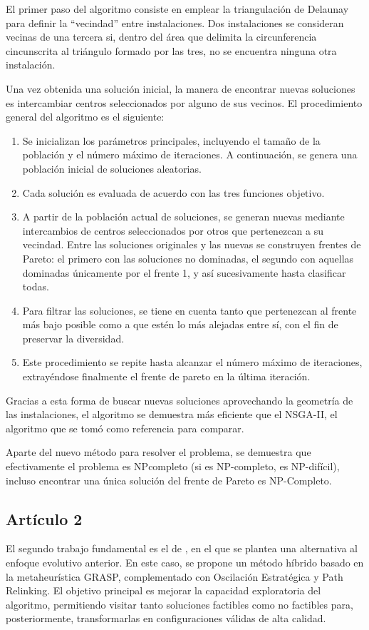 \documentclass[12pt,a4paper]{book}
\begin{document}
El primer paso del algoritmo consiste en emplear la triangulación de Delaunay \cite{delaunay} para definir la ``vecindad'' entre instalaciones. Dos instalaciones se consideran vecinas de una tercera si, 
dentro del área que delimita la circunferencia cincunscrita al triángulo formado por las tres, no se encuentra ninguna otra instalación. 

Una vez obtenida una solución inicial, la manera de encontrar nuevas soluciones es intercambiar centros seleccionados por alguno de sus vecinos. El procedimiento general del algoritmo es el siguiente:

\begin{enumerate}
    \item Se inicializan los parámetros principales, incluyendo el tamaño de la población y el número máximo de iteraciones. A continuación, se genera una población inicial de soluciones aleatorias.
    \item Cada solución es evaluada de acuerdo con las tres funciones objetivo.
    \item A partir de la población actual de soluciones, se generan nuevas mediante intercambios de centros seleccionados por otros que pertenezcan a su vecindad. Entre las soluciones originales y las nuevas se construyen frentes
    de Pareto: el primero con las soluciones no dominadas, el segundo con aquellas dominadas únicamente por el frente 1, y así sucesivamente hasta clasificar todas. 
    \item Para filtrar las soluciones, se tiene en cuenta tanto que pertenezcan al frente más bajo posible como a que estén lo más alejadas entre sí, con el fin de preservar la diversidad. 
    \item Este procedimiento se repite hasta alcanzar el número máximo de iteraciones,  extrayéndose finalmente el frente de pareto en la última iteración.
\end{enumerate}
Gracias a esta forma de buscar nuevas soluciones aprovechando la geometría de las instalaciones, el algoritmo se demuestra más eficiente que el NSGA-II, el algoritmo que se tomó 
como referencia para comparar. 

Aparte del nuevo método para resolver el problema, se demuestra que efectivamente el problema es NP\-completo (si es NP-completo, es NP-difícil), incluso encontrar una única
solución del frente de Pareto es NP-Completo.

\subsection{Artículo 2}
El segundo trabajo fundamental es el de \citet{k-Balanced_2}, en el que se plantea una alternativa al enfoque evolutivo anterior. En este caso, se propone un método híbrido basado en la metaheurística GRASP, complementado con Oscilación Estratégica y Path Relinking. El objetivo principal es mejorar la capacidad exploratoria del algoritmo, permitiendo visitar tanto soluciones factibles como no factibles para, posteriormente, transformarlas en configuraciones válidas de alta calidad.
\end{document}
